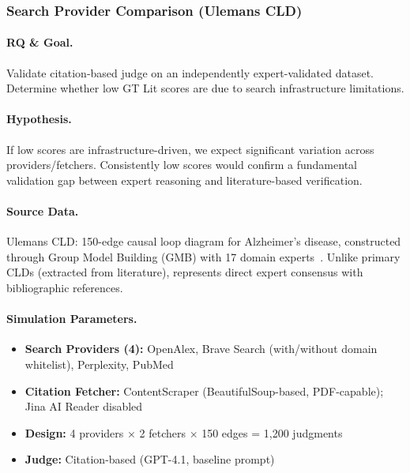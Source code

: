 \subsubsection{Search Provider Comparison (Ulemans CLD)}
\label{sec:ulemans_validation}

\paragraph{RQ \& Goal.}
Validate citation-based judge on an independently expert-validated dataset. Determine whether low GT Lit scores are due to search infrastructure limitations.

\paragraph{Hypothesis.}
If low scores are infrastructure-driven, we expect significant variation across providers/fetchers. Consistently low scores would confirm a fundamental validation gap between expert reasoning and literature-based verification.

\paragraph{Source Data.}
Ulemans CLD: 150-edge causal loop diagram for Alzheimer's disease, constructed through Group Model Building (GMB) with 17 domain experts~\cite{uleman2024triangulation}. Unlike primary CLDs (extracted from literature), represents direct expert consensus with bibliographic references.

\paragraph{Simulation Parameters.}
\begin{itemize}[noitemsep]
    \item \textbf{Search Providers (4):} OpenAlex, Brave Search (with/without domain whitelist), Perplexity, PubMed
    \item \textbf{Citation Fetcher:} ContentScraper (BeautifulSoup-based, PDF-capable); Jina AI Reader disabled
    \item \textbf{Design:} 4 providers $\times$ 2 fetchers $\times$ 150 edges = 1,200 judgments
    \item \textbf{Judge:} Citation-based (GPT-4.1, baseline prompt)
\end{itemize}

